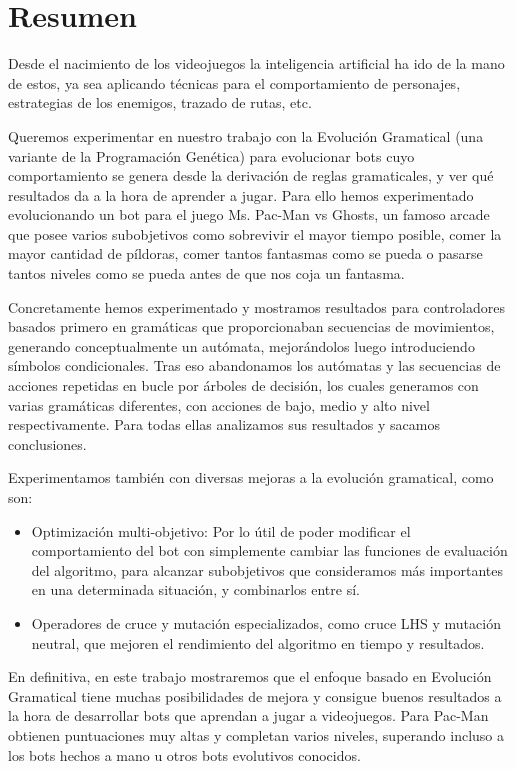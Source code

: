 \chapter{Resumen}
Desde el nacimiento de los videojuegos la inteligencia artificial ha ido de la mano de estos, ya sea aplicando técnicas para el comportamiento de personajes, estrategias de los enemigos, trazado de rutas, etc.

Queremos experimentar en nuestro trabajo con la Evolución Gramatical (una variante de la Programación Genética) para evolucionar bots cuyo comportamiento se genera desde la derivación de reglas gramaticales, y ver qué resultados da a la hora de aprender a jugar. Para ello hemos experimentado evolucionando un bot para el juego Ms. Pac-Man vs Ghosts, un famoso arcade que posee varios subobjetivos como sobrevivir el mayor tiempo posible, comer la mayor cantidad de píldoras, comer tantos fantasmas como se pueda o pasarse tantos niveles como se pueda antes de que nos coja un fantasma.
 
Concretamente hemos experimentado y mostramos resultados para controladores basados primero en gramáticas que proporcionaban secuencias de movimientos, generando conceptualmente un autómata, mejorándolos luego introduciendo símbolos condicionales. 
Tras eso abandonamos los autómatas y las secuencias de acciones repetidas en bucle por árboles de decisión, los cuales generamos con varias gramáticas diferentes, con acciones de bajo, medio y alto nivel respectivamente. Para todas ellas analizamos sus resultados y sacamos conclusiones. 
 
Experimentamos también con diversas mejoras a la evolución gramatical, como son:
\begin{itemize}
\item Optimización multi-objetivo: Por lo útil de poder modificar el comportamiento del bot con simplemente cambiar las funciones de evaluación del algoritmo, para alcanzar subobjetivos que consideramos más importantes en una determinada situación, y combinarlos entre sí.
\item Operadores de cruce y mutación especializados, como cruce LHS y mutación neutral, que mejoren el rendimiento del algoritmo en tiempo y resultados.
\end{itemize}
 
En definitiva, en este trabajo mostraremos que el enfoque basado en Evolución Gramatical tiene muchas posibilidades de mejora y consigue buenos resultados a la hora de desarrollar bots que aprendan a jugar a videojuegos. Para Pac-Man obtienen puntuaciones muy altas y completan varios niveles, superando incluso a los bots hechos a mano u otros bots evolutivos conocidos.
